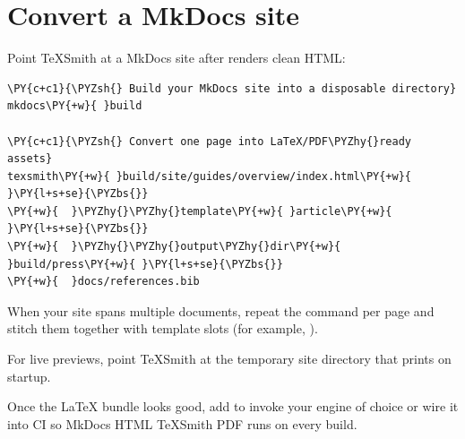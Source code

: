 \documentclass[a4paper,twoside]{article}
\begin{document}
\section{Convert a MkDocs site}
Point TeXSmith at a MkDocs site after  renders clean HTML:
\begin{tscode}[lang=bash, engine=pygments]
\begin{Verbatim}[commandchars=\\\{\},breaklines, breakanywhere, commandchars=\\\{\}]
\PY{c+c1}{\PYZsh{} Build your MkDocs site into a disposable directory}
mkdocs\PY{+w}{ }build

\PY{c+c1}{\PYZsh{} Convert one page into LaTeX/PDF\PYZhy{}ready assets}
texsmith\PY{+w}{ }build/site/guides/overview/index.html\PY{+w}{ }\PY{l+s+se}{\PYZbs{}}
\PY{+w}{  }\PYZhy{}\PYZhy{}template\PY{+w}{ }article\PY{+w}{ }\PY{l+s+se}{\PYZbs{}}
\PY{+w}{  }\PYZhy{}\PYZhy{}output\PYZhy{}dir\PY{+w}{ }build/press\PY{+w}{ }\PY{l+s+se}{\PYZbs{}}
\PY{+w}{  }docs/references.bib
\end{Verbatim}
\end{tscode}
\begin{tscallout}[kind=tip]
When your site spans multiple documents, repeat the command per page and stitch them together with template slots (for example, ).

For live previews, point TeXSmith at the temporary site directory that  prints on startup.

Once the \LaTeX{} bundle looks good, add  to invoke your engine of choice or wire it into CI so MkDocs HTML TeXSmith PDF runs on every build.
\end{tscallout}
\end{document}

